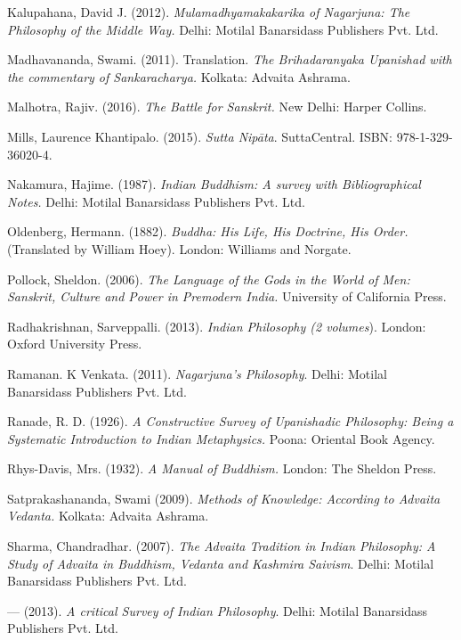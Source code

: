 \begin{thebibliography}{99}
  Kalupahana, David J. (2012). \textit{Mulamadhyamakakarika of Nagarjuna: The Philosophy of the Middle Way.} Delhi: Motilal Banarsidass Publishers Pvt. Ltd.

  Madhavananda, Swami. (2011). Translation. \textit{The Brihadaranyaka Upanishad with the commentary of Sankaracharya.} Kolkata: Advaita Ashrama.

  Malhotra, Rajiv. (2016). \textit{The Battle for Sanskrit.} New Delhi: Harper Collins.

  Mills, Laurence Khantipalo. (2015). \textit{Sutta Nipāta}. SuttaCentral. ISBN: 978-1-329-36020-4.

  Nakamura, Hajime. (1987).\textit{ Indian Buddhism: A survey with Bibliographical Notes.} Delhi: Motilal Banarsidass Publishers Pvt. Ltd.

  Oldenberg, Hermann. (1882). \textit{Buddha: His Life, His Doctrine, His Order.} (Translated by William Hoey). London: Williams and Norgate.

  Pollock, Sheldon. (2006).\textit{ The Language of the Gods in the World of Men: Sanskrit, Culture and Power in Premodern India.} University of California Press.

  Radhakrishnan, Sarveppalli. (2013). \textit{Indian Philosophy (2 volumes}). London: Oxford University Press.

  Ramanan. K Venkata. (2011). \textit{Nagarjuna’s Philosophy}. Delhi: Motilal Banarsidass Publishers Pvt. Ltd.

  Ranade, R. D. (1926). \textit{A Constructive Survey of Upanishadic Philosophy: Being a Systematic Introduction to Indian Metaphysics.} Poona: Oriental Book Agency.

  Rhys-Davis, Mrs. (1932). \textit{A Manual of Buddhism.} London: The Sheldon Press.

  Satprakashananda, Swami (2009). \textit{Methods of Knowledge: According to Advaita Vedanta.} Kolkata: Advaita Ashrama.

  Sharma, Chandradhar. (2007). \textit{The Advaita Tradition in Indian Philosophy: A Study of Advaita in Buddhism, Vedanta and Kashmira Saivism}. Delhi: Motilal Banarsidass Publishers Pvt. Ltd.

  — (2013). \textit{A critical Survey of Indian Philosophy}. Delhi: Motilal Banarsidass Publishers Pvt. Ltd.


\end{thebibliography}
